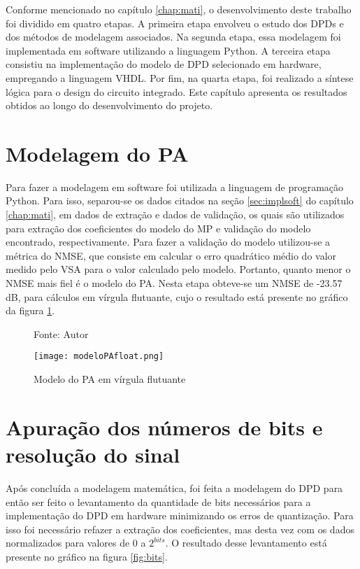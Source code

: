 Conforme mencionado no capítulo \ref{chap:mati}, o desenvolvimento deste trabalho foi dividido em quatro etapas. A primeira etapa envolveu o estudo dos DPDs e dos métodos de modelagem associados. Na segunda etapa, essa modelagem foi implementada em software utilizando a linguagem Python. A terceira etapa consistiu na implementação do modelo de DPD selecionado em hardware, empregando a linguagem VHDL. Por fim, na quarta etapa, foi realizado a síntese lógica para o design do circuito integrado. Este capítulo apresenta os resultados obtidos ao longo do desenvolvimento do projeto.

\section{Modelagem do PA}

Para fazer a modelagem em software foi utilizada a linguagem de programação Python. Para isso, separou-se os dados citados na seção \ref{sec:implsoft} do capítulo \ref{chap:mati}, em dados de extração e dados de validação, os quais são utilizados para extração dos coeficientes do modelo do MP e validação do modelo encontrado, respectivamente. Para fazer a validação do modelo utilizou-se a métrica do NMSE, que consiste em calcular o erro quadrático médio do valor medido pelo VSA para o valor calculado pelo modelo. Portanto, quanto menor o NMSE mais fiel é o modelo do PA. Nesta etapa obteve-se um NMSE de -23.57 dB, para cálculos em vírgula flutuante, cujo o resultado está presente no gráfico da figura \ref{fig:modelopafloat}.

\begin{figure}[htbp!]
    \centering
    \captionsetup{justification=centering}
    \caption*{Fonte: Autor}
    \texttt{[image: modeloPAfloat.png]}
    \caption{Modelo do PA em vírgula flutuante}
    \label{fig:modelopafloat}
\end{figure}

\section{Apuração dos números de bits e resolução do sinal} 

Após concluída a modelagem matemática, foi feita a modelagem do DPD para então ser feito o levantamento da quantidade de bits necessários para a implementação do DPD em hardware minimizando os erros de quantização. 
Para isso foi necessário refazer a extração dos coeficientes, mas desta vez com os dados normalizados para valores de 0 a $2^{bits}$.  
O resultado desse levantamento está presente no gráfico na figura \ref{fig:bits}.


